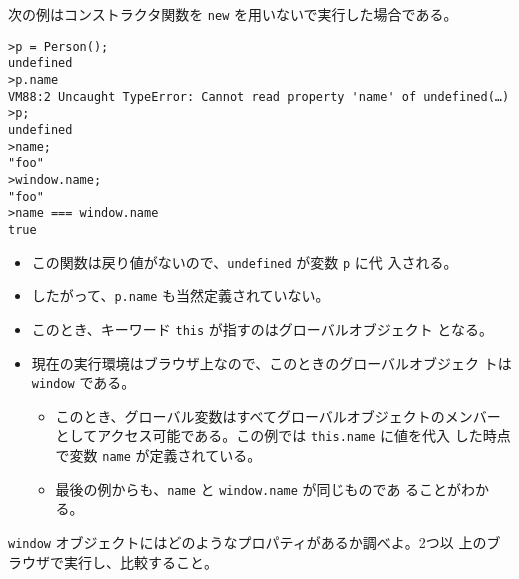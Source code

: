 \begin{Exec}\upshape
次の例はコンストラクタ関数を \verb+new+ を用いないで実行した場合である。
\begin{Verbatim}
>p = Person();
undefined
>p.name
VM88:2 Uncaught TypeError: Cannot read property 'name' of undefined(…)
>p;
undefined
>name;
"foo"
>window.name;
"foo"
>name === window.name
true
\end{Verbatim}
\begin{itemize}\upshape
 \item この関数は戻り値がないので、\verb+undefined+ が変数 \verb+p+ に代
       入される。
 \item したがって、\texttt{p.name} も当然定義されていない。
 \item このとき、キーワード \verb+this+ が指すのはグローバルオブジェクト
       となる。
 \item 現在の実行環境はブラウザ上なので、このときのグローバルオブジェク
       トは \verb+window+ である。
 \begin{itemize}
  \item このとき、グローバル変数はすべてグローバルオブジェクトのメンバー
	としてアクセス可能である。この例では \verb+this.name+ に値を代入
	した時点で変数 \verb+name+ が定義されている。
  \item 最後の例からも、\verb+name+ と \verb+window.name+ が同じものであ
	ることがわかる。
 \end{itemize}
\end{itemize}
\end{Exec}
\begin{Prob}\upshape
\verb+window+ オブジェクトにはどのようなプロパティがあるか調べよ。2つ以
 上のブラウザで実行し、比較すること。
\end{Prob}
\iffalse
\begin{Prob}
実行例\ref{constructor}を次のように変える。
\begin{Verbatim}
function Person(D){
  this.name = "foo";
  this.birthday = {
    year : 2001,
    month : 4,
    day : 1
  };
  this["hometown"] = "神奈川";
  return D;
}
\end{Verbatim}
これに対して次のように実行したとき、作成されるオブジェクトは
 何か答えよ。
\begin{enumerate}
 \item \verb+p = new Person(1);+
 \item \verb+p = new Person([1,2,3]);+
 \item \verb+p = new Person({o:"1"});+
 \item \verb+p = new Person(function(){return 2;});+
 \item \verb+p = new Person(new function(){this.a = "a"});+
\end{enumerate}
\end{Prob}
\fi
